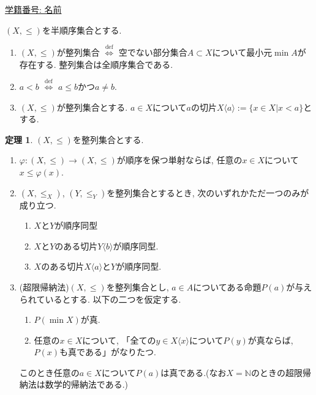 \documentclass[dvipdfmx,a4paper,11pt]{article}
\newcommand{\N}{\mathbb{N}}
\theoremstyle{definition}
\newtheorem{thm}{定理}
\begin{document}
 \begin{flushleft}
{ \large \underline{学籍番号: \hspace{4cm} 名前  \hspace{8.5cm}}}
{\footnotesize }
\end{flushleft}


\begin{tcolorbox}[
    colback = white,
    colframe = black!35!black,
    fonttitle = \bfseries,
    breakable = true]
    $(X, \le)$を半順序集合とする.
    \begin{enumerate}
    \setlength{\parskip}{0cm} 
  \setlength{\itemsep}{0cm} 
  \item $(X, \le)$が整列集合 $\stackrel{\mathrm{def}}{\Longleftrightarrow}$ 空でない部分集合$A \subset X$について最小元$\min A$が存在する. 
  整列集合は全順序集合である.
  \item $a < b$ $\stackrel{\mathrm{def}}{\Longleftrightarrow}$ $a \le b$かつ$a \neq b$.
  \item $(X, \le)$が整列集合とする. 
  $a \in X$について$a$の切片$X\langle a\rangle:= \{ x \in X | x < a\}$とする. 
   \end{enumerate}
 \end{tcolorbox}

\begin{tcolorbox}[
    colback = white,
    colframe = black!35!black,
    fonttitle = \bfseries,
    breakable = true]
\begin{thm}
    $(X, \le)$を整列集合とする. 
    \begin{enumerate}
    \setlength{\parskip}{0cm} 
  \setlength{\itemsep}{0cm} 
  \item $\varphi : (X, \le) \to (X, \le)$が順序を保つ単射ならば, 任意の$x \in X$について$x \le \varphi(x)$.
  \item $(X, \le_X)$, $(Y, \le_Y)$を整列集合とするとき, 次のいずれかただ一つのみが成り立つ. 
        \begin{enumerate}[label=(\arabic*).]
 \setlength{\parskip}{0cm}
  \setlength{\itemsep}{0pt}
  \item $X$と$Y$が順序同型
  \item $X$と$Y$のある切片$Y\langle b\rangle$が順序同型.
  \item $X$のある切片$X\langle a\rangle$と$Y$が順序同型.
  \end{enumerate}
  \item (超限帰納法)$(X, \le)$を整列集合とし, $a \in A$についてある命題$P(a)$が与えられているとする.
  以下の二つを仮定する. 
          \begin{enumerate}[label=(\arabic*).]
 \setlength{\parskip}{0cm}
  \setlength{\itemsep}{0pt}
  \item $P(\min X)$が真.
  \item 任意の$x \in X$について, 「全ての$y \in X \langle x\rangle$について$P(y)$が真ならば, $P(x)$も真である」がなりたつ.
  \end{enumerate}
  このとき任意の$a \in X$について$P(a)$は真である.(なお$X = \N$のときの超限帰納法は数学的帰納法である.)
    \end{enumerate}
    \end{thm}
 \end{tcolorbox}
 
\end{document}
